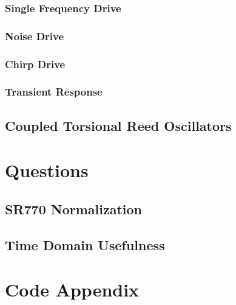 \documentclass{article}
\begin{document}
\subsubsection{Single Frequency Drive}%
\label{ssub:single_frequency_drive}

\subsubsection{Noise Drive}%
\label{ssub:noise_drive}

\subsubsection{Chirp Drive}%
\label{ssub:chirp_drive}

\subsubsection{Transient Response}%
\label{ssub:transient_response}

\subsection{Coupled Torsional Reed Oscillators}%
\label{sub:coupled_torsional_reed_oscillators}


\section{Questions}%
\label{sec:questions}

\subsection{SR770 Normalization}%
\label{sub:sr770_normalization}

\subsection{Time Domain Usefulness}%
\label{sub:time_domain_usefulness}

\section{Code Appendix}%
\label{sec:code_appendix}
\end{document}
